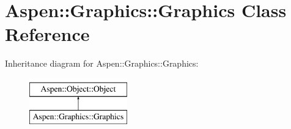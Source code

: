 \hypertarget{class_aspen_1_1_graphics_1_1_graphics}{\section{Aspen\-:\-:Graphics\-:\-:Graphics Class Reference}
\label{class_aspen_1_1_graphics_1_1_graphics}
}
Inheritance diagram for Aspen\-:\-:Graphics\-:\-:Graphics\-:\begin{figure}[H]
\begin{center}
\leavevmode
\includegraphics[height=2.000000cm]{d3/d06/class_aspen_1_1_graphics_1_1_graphics}
\end{center}
\end{figure}
